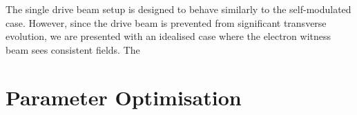 \documentclass[aps,prstab,reprint,amsmath,amssymb,groupedaddress]{revtex4-1}
\begin{document}

The single drive beam setup is designed to behave similarly to the self-modulated case. However, since the drive beam is
prevented from significant transverse evolution, we are presented with an idealised case where the electron witness beam
sees consistent fields. The 















\section[\label{S:PO}]{Parameter Optimisation}
\end{document}
